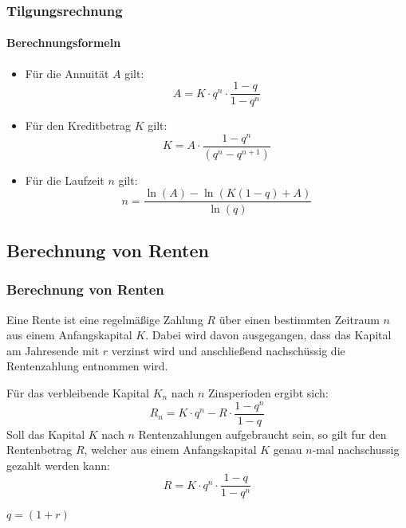 \documentclass{beamer}
\begin{document}
\begin{frame}
  \frametitle{Tilgungsrechnung}  
  \framesubtitle{Berechnungsformeln}
  \begin{itemize}
    \item Für die Annuität $A$ gilt: $$ A = K \cdot q^n \cdot \frac{1-q}{1-q^n}$$
    \item Für den Kreditbetrag $K$ gilt: $$ K = A\cdot \frac{1-q^n}{(q^n-q^{n+1})}$$
    \item Für die Laufzeit $n$ gilt: $$ n =     \frac{\ln(A)-\ln(K(1-q)+A)}{\ln(q)}$$
  \end{itemize}
\end{frame}

\subsection{Berechnung von Renten}
\begin{frame}
  \frametitle{Berechnung von Renten}
  
  Eine Rente ist eine regelmäßige Zahlung $R$ über einen bestimmten Zeitraum $n$ aus einem Anfangskapital $K$. Dabei wird davon ausgegangen, dass das Kapital am Jahresende mit $r$ verzinst wird und anschließend nachschüssig die Rentenzahlung entnommen wird.
  
  \vspace{0.5cm}

  Für das verbleibende Kapital $K_n$ nach $n$ Zinsperioden ergibt sich:
  $$R_n = K \cdot q^n - R \cdot \frac{1-q^n}{1-q}$$
  Soll das Kapital $K$ nach $n$ Rentenzahlungen aufgebraucht sein, so gilt fur den
Rentenbetrag $R$, welcher aus einem Anfangskapital $K$ genau $n$-mal nachschussig
gezahlt werden kann:
$$R = K \cdot q^n \cdot \frac{1-q}{1-q^n}$$ 

$q=(1+r)$
  
\end{frame}
\end{document}
